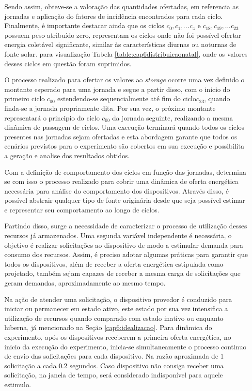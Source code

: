 Sendo assim, obteve-se a valoração das quantidades ofertadas, em referencia as jornadas e aplicação do fatores de incidência encontrados para cada ciclo. Finalmente, é importante destacar ainda que os ciclos $c_0, c_1,... c_4$ e $c_{18}, c_{19},... c_{23}$ possuem peso atribuído zero, representam os ciclos onde não foi possível ofertar energia coletável significante, similar às características diurnas ou noturnas de fonte solar. para visualização Tabela \ref{table:cap6distribuicaonatal}, onde os valores desses ciclos em questão foram suprimidos.

O processo realizado para ofertar os valores ao \textit{storage} ocorre uma vez definido o montante esperado para uma jornada e segue a partir disso, com o inicio do primeiro ciclo $c_{00}$ estendendo-se sequencialmente até fim do ciclo$c_{23}$, quando finda-se a jornada propriamente dita. Por sua vez, o próximo montante representará o principio do ciclo $c_{00}$ da jornada seguinte, realizando a mesma dinâmica de passagem de ciclos. Uma execução terminará quando todos os ciclos presentes nas jornadas sejam ofertadas e esta abordagem garante que todos os cenários previstos para o experimento são cobertos em sua execução e possibilita a geração e analise dos resultados obtidos.


Com a definição de comportamento dos ciclos em função das jornadas, determina-se com isso o processo realizado para cobrir uma dinâmica de oferta energética necessária para análise do comportamento dos dispositivos. Através disso, é possível abstrair qualquer tipo de fonte originária desde que seja possível estimar e representar seu comportamento ao longo de ciclos.

Partindo disso, surge a necessidade de caracterizar o processo de utilização desses recursos já armazenados. Uma segunda variável independente é necessária, o objetivo é realizar solicitações ao dispositivo de modo a estimular demanda para consumo dos recursos. Assim, é preciso adotar algumas práticas para garantir que todos os dispositivos, além de receber a oferta energética estipulada como projetado, também sejam capazes de receber a mesma carga de solicitações que geram demandas, aproximadamente ao mesmo tempo. 

Na ação de atender uma solicitação, o dispositivo provedor é conduzido para iniciar ou permanecer em estado ativo, este estado por sua vez intensifica a utilização de recursos quando comparado com estado inativo ou enquanto hiberna, já mencionado na Seção \ref{cap6:idealizacao}. Para dinâmica do experimento, após os dispositivos receberem a primeira oferta energética, no inicio da execução do experimento, inicia-se simultaneamente o processo continuo de envio das solicitações para cada dispositivo. Na razão aproximada de 1 solicitação a cada 0.2 segundos. Caso dispositivo não consiga receber uma solicitação, na janela de tempo, será considerado indisponível para aquele estimulo. 

